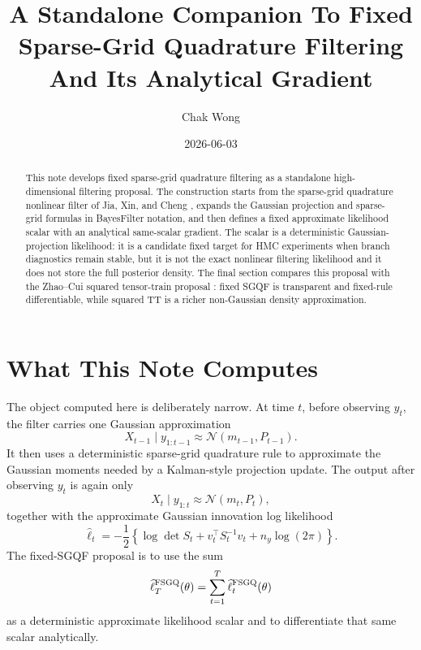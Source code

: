 \documentclass[11pt]{article}
\title{A Standalone Companion To Fixed Sparse-Grid Quadrature Filtering And Its Analytical Gradient}
\author{Chak Wong}
\date{2026-06-03}
\numberwithin{equation}{section}
\newcommand{\N}{\mathcal N}
\newcommand{\ellhat}{\widehat\ell}
\begin{document}
\maketitle

\begin{abstract}
This note develops fixed sparse-grid quadrature filtering as a standalone
high-dimensional filtering proposal.  The construction starts from the
sparse-grid quadrature nonlinear filter of Jia, Xin, and Cheng
\cite{jia2012sparsegrid}, expands the Gaussian projection and sparse-grid
formulas in BayesFilter notation, and then defines a fixed approximate
likelihood scalar with an analytical same-scalar gradient.  The scalar is a
deterministic Gaussian-projection likelihood: it is a candidate fixed target
for HMC experiments when branch diagnostics remain stable, but it is not the
exact nonlinear filtering likelihood and it does not store the full posterior
density.  The final section compares this proposal with the Zhao--Cui squared
tensor-train proposal \cite{zhao2024ttsequential}: fixed SGQF is transparent
and fixed-rule differentiable, while squared TT is a richer non-Gaussian
density approximation.
\end{abstract}

\tableofcontents

\section{What This Note Computes}
\label{sec:p31-computes}

The object computed here is deliberately narrow.  At time \(t\), before
observing \(y_t\), the filter carries one Gaussian approximation
\begin{equation}
  X_{t-1}\mid y_{1:t-1}
  \approx
  \N(m_{t-1},P_{t-1}).
  \label{eq:p31-carried-gaussian}
\end{equation}
It then uses a deterministic sparse-grid quadrature rule to approximate the
Gaussian moments needed by a Kalman-style projection update.  The output after
observing \(y_t\) is again only
\begin{equation}
  X_t\mid y_{1:t}
  \approx
  \N(m_t,P_t),
  \label{eq:p31-output-gaussian}
\end{equation}
together with the approximate Gaussian innovation log likelihood
\begin{equation}
  \ellhat_t
  =
  -\frac12
  \left\{
  \log\det S_t+v_t^\top S_t^{-1}v_t+n_y\log(2\pi)
  \right\}.
  \label{eq:p31-innovation-loglik-opening}
\end{equation}
The fixed-SGQF proposal is to use the sum
\begin{equation}
  \ellhat_T^{\rm FSGQ}(\theta)=\sum_{t=1}^T \ellhat_t^{\rm FSGQ}(\theta)
  \label{eq:p31-total-fixed-scalar-opening}
\end{equation}
as a deterministic approximate likelihood scalar and to differentiate that
same scalar analytically.
\end{document}
